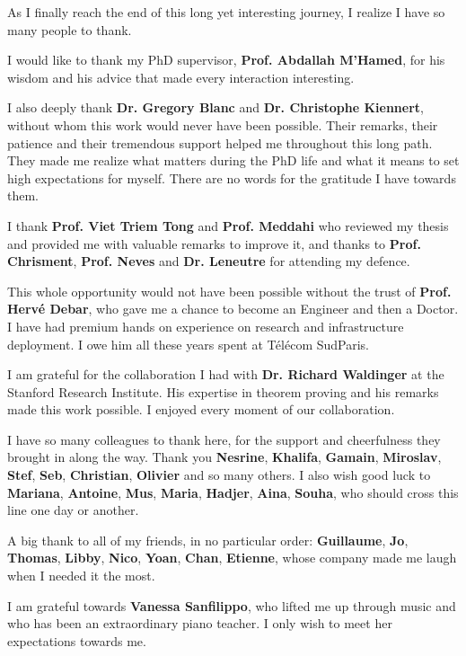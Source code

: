\documentclass[a4paper, 11pt]{report}
\theoremstyle{definition}
\begin{document}
As I finally reach the end of this long yet interesting journey, I realize I have so many people to thank.

I would like to thank my PhD supervisor, \textbf{Prof. Abdallah M'Hamed}, for his wisdom and his advice that made every interaction interesting.

I also deeply thank \textbf{Dr. Gregory Blanc} and \textbf{Dr. Christophe Kiennert}, without whom this work 
would never have been possible. Their remarks, their patience and their tremendous support helped me throughout this long path. They made me realize what matters during the PhD life and what it means to set high expectations for myself. There are no words for the gratitude I have towards them.

I thank \textbf{Prof. Viet Triem Tong} and \textbf{Prof. Meddahi} who reviewed my thesis and provided me with valuable remarks to improve it, and thanks to \textbf{Prof. Chrisment}, \textbf{Prof. Neves} and \textbf{Dr. Leneutre} for attending my defence.

This whole opportunity would not have been possible without the trust of \textbf{Prof. Herv\'e Debar}, who gave me a chance to become an Engineer and then a Doctor. I have had premium hands on experience on research and infrastructure deployment. I owe him all these years spent at T\'el\'ecom SudParis.

I am grateful for the collaboration I had with \textbf{Dr. Richard Waldinger} at the Stanford Research Institute. His expertise in theorem proving and his remarks made this work possible. I enjoyed every moment of our collaboration.

I have so many colleagues to thank here, for the support and cheerfulness they brought in along the way.
Thank you \textbf{Nesrine}, \textbf{Khalifa}, \textbf{Gamain}, \textbf{Miroslav}, \textbf{Stef}, \textbf{Seb}, \textbf{Christian}, \textbf{Olivier} and so many others. I also wish good luck to \textbf{Mariana}, \textbf{Antoine}, \textbf{Mus}, \textbf{Maria}, \textbf{Hadjer}, \textbf{Aina}, \textbf{Souha}, who should cross this line one day or another.

A big thank to all of my friends, in no particular order: \textbf{Guillaume}, \textbf{Jo}, \textbf{Thomas}, \textbf{Libby}, \textbf{Nico}, \textbf{Yoan}, \textbf{Chan}, \textbf{Etienne}, whose company made me laugh when I needed it the most. 

I am grateful towards \textbf{Vanessa Sanfilippo}, who lifted me up through music and who has been an extraordinary piano teacher. I only wish to meet her expectations towards me.
\end{document}
